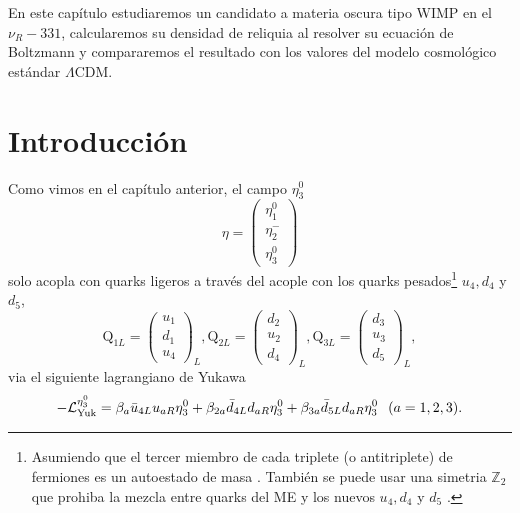 
En este capítulo estudiaremos un candidato a materia oscura tipo WIMP en el $\nu_R-331$, calcularemos su densidad de reliquia al resolver su ecuación de Boltzmann y compararemos el resultado con los valores del modelo cosmológico estándar $\Lambda$CDM.

\section[\hspace{-0.14in}Introduction]{Introducción} 

Como vimos en el capítulo anterior, el campo $\eta_3^0$
\begin{equation}
\eta = \begin{pmatrix} \eta_1^0  \\ \eta_2^- \\  \eta_3^0 \end{pmatrix}
\end{equation}
solo acopla con quarks ligeros a través del acople con los quarks pesados\footnote{Asumiendo que el tercer miembro de cada triplete (o antitriplete) de fermiones es un autoestado de masa \cite{Buras:2012dp,Cao:2016uur}. También se puede usar una simetria $\mathbb{Z}_2$ que prohiba la mezcla entre quarks del ME y los nuevos $u_4,d_4$ y $d_5$ \cite{Okada:2016whh}.} $u_4,d_4$ y $d_5$,
\begin{equation}
\text{Q}_{1L} = \left( \begin{array}{c}
u_1 \\ d_1  \\ u_4
\end{array} \right)_{L},  
\text{Q}_{2L} = \left( \begin{array}{c}
d_2 \\ u_2  \\ d_{4}
\end{array} \right)_L, 
\text{Q}_{3L} = \left( \begin{array}{c}
d_3 \\ u_3  \\ d_{5}
\end{array} \right)_L, 
\end{equation}
via el siguiente lagrangiano de Yukawa
\begin{equation}
-\mathcal{L}^{\eta_3^0}_{\rm Yuk} = \beta_a \bar{u}_{4L} u_{aR}\eta_3^0 + \beta_{2a} \bar{d}_{4L} d_{aR}\eta_3^0 + \beta_{3a} \bar{d}_{5L} d_{aR}\eta_3^0 \hspace{0.1in} (a=1,2,3).
\end{equation}
